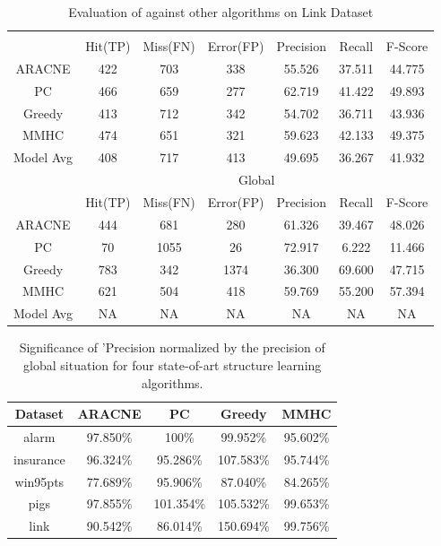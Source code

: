 \begin{table}[th]
\begin{center}
\caption{\label{tab:linkComp}Evaluation of \lama{} against other algorithms on Link Dataset}
\small
\begin{tabular}{|c|c|c|c|c|c|c|}
\hline
 &\multicolumn{6}{c|}{\lama{}}\\
\cline{2-7}
 & Hit(TP) & Miss(FN) & Error(FP) & Precision & Recall & F-Score \\
\hline
ARACNE & 422 & 703 & 338 & 55.526 & 37.511 & 44.775 \\
PC     & 466 & 659 & 277 & 62.719 & 41.422 & 49.893 \\
Greedy & 413 & 712 & 342 & 54.702 & 36.711 & 43.936 \\
MMHC   & 474 & 651 & 321 & 59.623 & 42.133 & 49.375 \\
\hline
Model Avg & 408 & 717 & 413 & 49.695 & 36.267 & 41.932 \\
\hline \hline
 &\multicolumn{6}{c|}{Global}\\
\cline{2-7}
 & Hit(TP) & Miss(FN) & Error(FP) & Precision & Recall & F-Score \\
\hline
ARACNE & 444& 681&280 & 61.326 & 39.467 & 48.026 \\
PC     & 70 &1055& 26 & 72.917 & 6.222  & 11.466 \\
Greedy & 783& 342&1374& 36.300 & 69.600 & 47.715 \\
MMHC   & 621& 504&418 & 59.769 & 55.200 & 57.394 \\
\hline
Model Avg & NA & NA & NA & NA & NA & NA \\
\hline
\end{tabular}
\end{center}
\end{table}

\begin{table}[th]
\begin{center}
\caption{\label{tab:precisonComp}Significance of \lama{}'Precision normalized by the precision of global situation for four state-of-art structure learning algorithms.}
\small
\begin{tabular}{|c|cccc|}
\hline
Dataset   & ARACNE & PC & Greedy & MMHC \\
\hline
alarm     & 97.850\% & 100\%    & 99.952\% & 95.602\% \\
insurance & 96.324\% & 95.286\% & 107.583\%& 95.744\% \\
win95pts  & 77.689\% & 95.906\% & 87.040\% & 84.265\% \\
pigs      & 97.855\% & 101.354\%& 105.532\%& 99.653\% \\
link      & 90.542\% & 86.014\% & 150.694\%& 99.756\% \\
\hline
\end{tabular}
\end{center}
\end{table}

